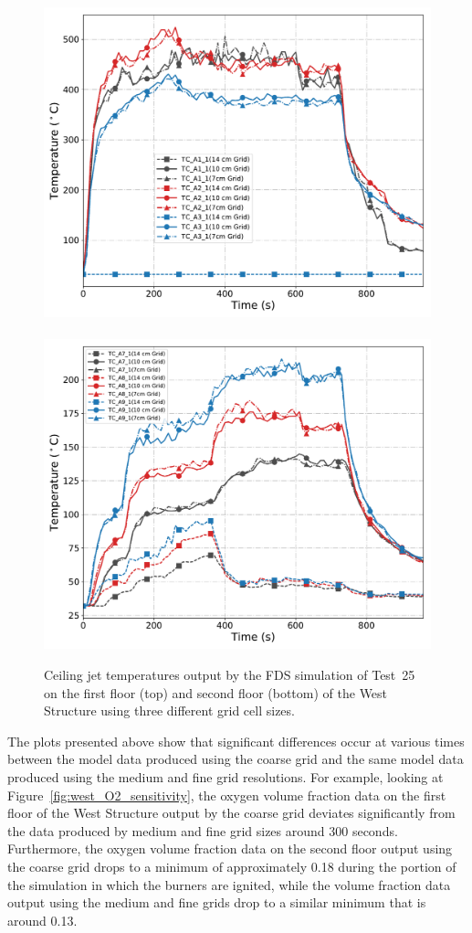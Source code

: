 \begin{figure}[!h]
	\centering
	\includegraphics[width=0.86\columnwidth]{Figures/Plots/Grid_Sensitivity/Temperature/Test_25_cjet_1}
	\\~\\
	\includegraphics[width=0.86\columnwidth]{Figures/Plots/Grid_Sensitivity/Temperature/Test_25_cjet_2}
	\caption[Ceiling jet temperatures for West Structure simulation with different grid cell sizes.]{Ceiling jet temperatures output by the FDS simulation of Test~25 on the first floor (top) and second floor (bottom) of the West Structure using three different grid cell sizes.}
	\label{fig:west_cjet_sensitivity}
\end{figure}

\FloatBarrier

The plots presented above show that significant differences occur at various times between the model data produced using the coarse grid and the same model data produced using the medium and fine grid resolutions. For example, looking at Figure~\ref{fig:west_O2_sensitivity}, the oxygen volume fraction data on the first floor of the West Structure output by the coarse grid deviates significantly from the data produced by medium and fine grid sizes around 300 seconds. Furthermore, the oxygen volume fraction data on the second floor output using the coarse grid drops to a minimum of approximately 0.18 during the portion of the simulation in which the burners are ignited, while the volume fraction data output using the medium and fine grids drop to a similar minimum that is around 0.13. 

